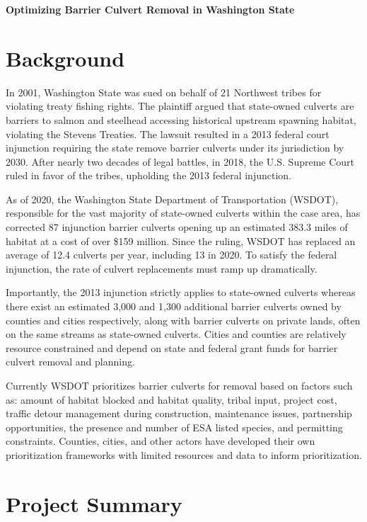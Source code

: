 \documentclass[12pt]{elsarticle}
\begin{document}
\begin{center} \textbf{Optimizing Barrier Culvert Removal in Washington State} \end{center}


\section{Background} 
In 2001, Washington State was sued on behalf of 21 Northwest tribes for violating treaty fishing rights. The plaintiff argued that state-owned culverts are barriers to salmon and steelhead accessing historical upstream spawning habitat, violating the Stevens Treaties. The lawsuit resulted in a 2013 federal court injunction requiring the state remove barrier culverts under its jurisdiction by 2030. After nearly two decades of legal battles, in 2018, the U.S. Supreme Court ruled in favor of the tribes, upholding the 2013 federal injunction. 

As of 2020, the Washington State Department of Transportation (WSDOT), responsible for the vast majority of state-owned culverts within the case area, has corrected 87 injunction barrier culverts opening up an estimated 383.3 miles of habitat at a cost of over \$159 million. Since the ruling, WSDOT has replaced an average of 12.4 culverts per year, including 13 in 2020. To satisfy the federal injunction, the rate of culvert replacements must ramp up dramatically.  

Importantly, the 2013 injunction strictly applies to state-owned culverts whereas there exist an estimated 3,000 and 1,300 additional barrier culverts owned by counties and cities respectively, along with barrier culverts on private lands, often on the same streams as state-owned culverts. Cities and counties are relatively resource constrained and depend on state and federal grant funds for barrier culvert removal and planning.

Currently WSDOT prioritizes barrier culverts for removal based on factors such as: amount of habitat blocked and habitat quality, tribal input, project cost, traffic detour management during construction, maintenance issues, partnership opportunities, the presence and number of ESA listed species, and permitting constraints. Counties, cities, and other actors have developed their own prioritization frameworks with limited resources and data to inform prioritization. 

\section{Project Summary}\label{sec:summary} %
\end{document}
